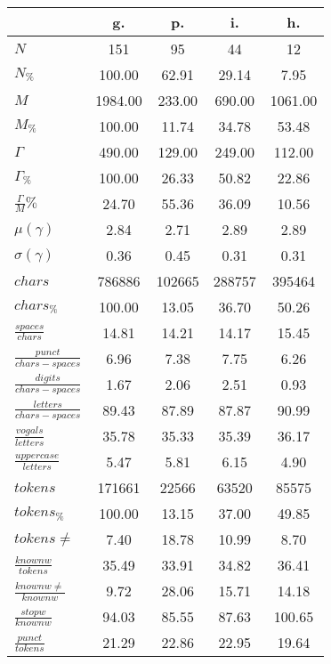 \begin{table}[h!]
\begin{center}
\begin{tabular}{| l || c | c | c | c |}\hline
 & {\bf g.} & {\bf p.} & {\bf i.} & {\bf h.} \\\hline\hline
$N$ & 151  & 95  & 44  & 12 \\
$N_{\%}$ & 100.00  & 62.91  & 29.14  & 7.95 \\\hline
$M$ & 1984.00  & 233.00  & 690.00  & 1061.00 \\
$M_{\%}$ & 100.00  & 11.74  & 34.78  & 53.48 \\\hline
$\Gamma$ & 490.00  & 129.00  & 249.00  & 112.00 \\
$\Gamma_{\%}$ & 100.00  & 26.33  & 50.82  & 22.86 \\\hline
$\frac{\Gamma}{M}\%$ & 24.70  & 55.36  & 36.09  & 10.56 \\
$\mu(\gamma)$ & 2.84  & 2.71  & 2.89  & 2.89 \\
$\sigma(\gamma)$ & 0.36  & 0.45  & 0.31  & 0.31 \\\hline\hline
$chars$ & 786886  & 102665  & 288757  & 395464 \\
$chars_{\%}$ & 100.00  & 13.05  & 36.70  & 50.26 \\\hline
$\frac{spaces}{chars}$ & 14.81  & 14.21  & 14.17  & 15.45 \\
$\frac{punct}{chars-spaces}$ & 6.96  & 7.38  & 7.75  & 6.26 \\
$\frac{digits}{chars-spaces}$ & 1.67  & 2.06  & 2.51  & 0.93 \\\hline
$\frac{letters}{chars-spaces}$ & 89.43  & 87.89  & 87.87  & 90.99 \\
$\frac{vogals}{letters}$ & 35.78  & 35.33  & 35.39  & 36.17 \\
$\frac{uppercase}{letters}$ & 5.47  & 5.81  & 6.15  & 4.90 \\\hline\hline
$tokens$ & 171661  & 22566  & 63520  & 85575 \\
$tokens_{\%}$ & 100.00  & 13.15  & 37.00  & 49.85 \\
$tokens \neq$ & 7.40  & 18.78  & 10.99  & 8.70 \\\hline
$\frac{knownw}{tokens}$ & 35.49  & 33.91  & 34.82  & 36.41 \\
$\frac{knownw \neq}{knownw}$ & 9.72  & 28.06  & 15.71  & 14.18 \\\hline
$\frac{stopw}{knownw}$ & 94.03  & 85.55  & 87.63  & 100.65 \\
$\frac{punct}{tokens}$ & 21.29  & 22.86  & 22.95  & 19.64 \\

\end{tabular}
\end{center}
\end{table}
